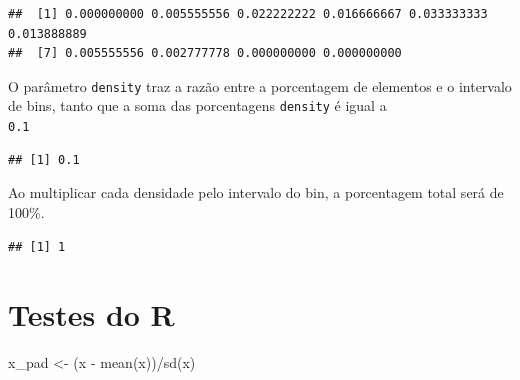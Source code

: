 \documentclass[
]{article}
\newenvironment{Shaded}{\begin{snugshade}}{\end{snugshade}}
\newcommand{\CommentTok}[1]{\textcolor[rgb]{0.56,0.35,0.01}{\textit{#1}}}
\newcommand{\DecValTok}[1]{\textcolor[rgb]{0.00,0.00,0.81}{#1}}
\newcommand{\FunctionTok}[1]{\textcolor[rgb]{0.00,0.00,0.00}{#1}}
\newcommand{\NormalTok}[1]{#1}
\newcommand{\OtherTok}[1]{\textcolor[rgb]{0.56,0.35,0.01}{#1}}
\newcommand{\SpecialCharTok}[1]{\textcolor[rgb]{0.00,0.00,0.00}{#1}}
\begin{document}
\begin{Shaded}
\end{Shaded}

\begin{verbatim}
##  [1] 0.000000000 0.005555556 0.022222222 0.016666667 0.033333333 0.013888889
##  [7] 0.005555556 0.002777778 0.000000000 0.000000000
\end{verbatim}

O parâmetro \texttt{density} traz a razão entre a porcentagem de
elementos e o intervalo de bins, tanto que a soma das porcentagens
\texttt{density} é igual a\\
\texttt{0.1}

\begin{Shaded}
\end{Shaded}

\begin{verbatim}
## [1] 0.1
\end{verbatim}

Ao multiplicar cada densidade pelo intervalo do bin, a porcentagem total
será de 100\%.

\begin{Shaded}
\end{Shaded}

\begin{verbatim}
## [1] 1
\end{verbatim}

\hypertarget{testes-do-r}{%
\section{Testes do R}\label{testes-do-r}}

\begin{Shaded}
\begin{Highlighting}[]
\NormalTok{x\_pad }\OtherTok{\textless{}{-}}\NormalTok{ (x }\SpecialCharTok{{-}} \FunctionTok{mean}\NormalTok{(x))}\SpecialCharTok{/}\FunctionTok{sd}\NormalTok{(x)}
\end{Highlighting}
\end{Shaded}
\end{document}
